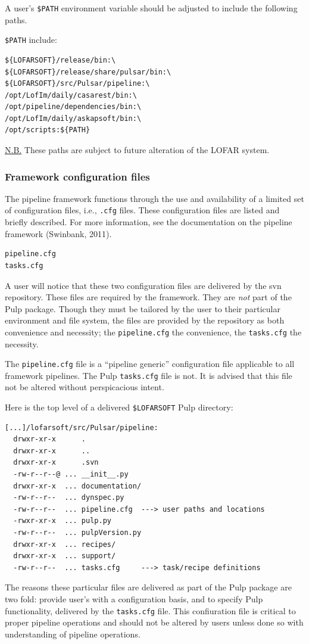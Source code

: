 \documentclass[a4paper,10pt,bibtotoc]{scrartcl}
\begin{document}
A user's \verb|$PATH| environment variable should be adjusted to include the following paths.

\verb|$PATH| include:
\begin{verbatim}
${LOFARSOFT}/release/bin:\ 
${LOFARSOFT}/release/share/pulsar/bin:\
${LOFARSOFT}/src/Pulsar/pipeline:\ 
/opt/LofIm/daily/casarest/bin:\ 
/opt/pipeline/dependencies/bin:\ 
/opt/LofIm/daily/askapsoft/bin:\ 
/opt/scripts:${PATH} 
\end{verbatim}
\underline{N.B.} These paths are subject to future alteration of the LOFAR system.

\subsubsection{Framework configuration files}
\label{sec:cfgfiles}
The pipeline framework functions through the use and availability of a limited set of configuration files, i.e., \verb|.cfg| files.  These configuration files are listed and briefly described.  For more information, see the documentation on the pipeline framework (Swinbank, 2011).\\
\begin{verbatim}
pipeline.cfg
tasks.cfg
\end{verbatim}
A user will notice that these two configuration files are delivered by
the svn repository.  These files are required by the framework.  They
are \emph{not} part of the Pulp package. Though they must be tailored by the
user to their particular environment and file system, the files are
provided by the repository as both convenience and necessity; the
\verb|pipeline.cfg| the convenience, the \verb|tasks.cfg| the necessity.

The \verb|pipeline.cfg| file is a ``pipeline generic'' configuration
file applicable to all framework pipelines.  The Pulp \verb|tasks.cfg|
file is not.  It is advised that this file not be altered without
perspicacious intent.

Here is the top level of a delivered \verb|$LOFARSOFT| Pulp directory:
\begin{verbatim}
[...]/lofarsoft/src/Pulsar/pipeline:
  drwxr-xr-x      .
  drwxr-xr-x      ..
  drwxr-xr-x      .svn
  -rw-r--r--@ ... __init__.py
  drwxr-xr-x  ... documentation/
  -rw-r--r--  ... dynspec.py
  -rw-r--r--  ... pipeline.cfg  ---> user paths and locations
  -rwxr-xr-x  ... pulp.py
  -rw-r--r--  ... pulpVersion.py
  drwxr-xr-x  ... recipes/
  drwxr-xr-x  ... support/
  -rw-r--r--  ... tasks.cfg     ---> task/recipe definitions
\end{verbatim}
The reasons these particular files are delivered as part of the Pulp
package are two fold: provide user's with a configuration basis, and
to specify Pulp functionality, delivered by the
\verb|tasks.cfg| file.  This confiuration file is critical to proper
pipeline operations and should not be altered by users unless done so
with understanding of pipeline operations.\\
\end{document}
